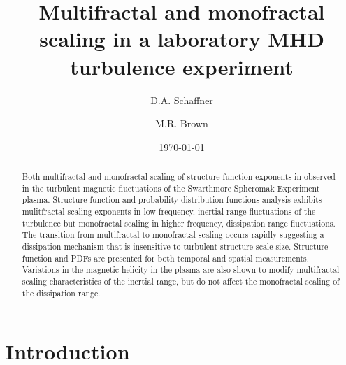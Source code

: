 \documentclass[aps,prl,amsmath,amssymb,reprint,superscriptaddress]{revtex4-1} %
\begin{document}
\title{Multifractal and monofractal scaling in a laboratory MHD turbulence experiment}

\author{D.A. Schaffner}
\author{M.R. Brown}

\date{\today}
\begin{abstract}
Both multifractal and monofractal scaling of structure function exponents in observed in the turbulent magnetic fluctuations of the Swarthmore Spheromak Experiment plasma. Structure function and probability distribution functions analysis exhibits mulitfractal scaling exponents in low frequency, inertial range fluctuations of the turbulence but monofractal scaling in higher frequency, dissipation range fluctuations. The transition from multifractal to monofractal scaling occurs rapidly suggesting a dissipation mechanism that is insensitive to turbulent structure scale size. Structure function and PDFs are presented for both temporal and spatial measurements. Variations in the magnetic helicity in the plasma are also shown to modify multifractal scaling characteristics of the inertial range, but do not affect the monofractal scaling of the dissipation range.
\end{abstract}

\maketitle

\section{Introduction}
\end{document}
